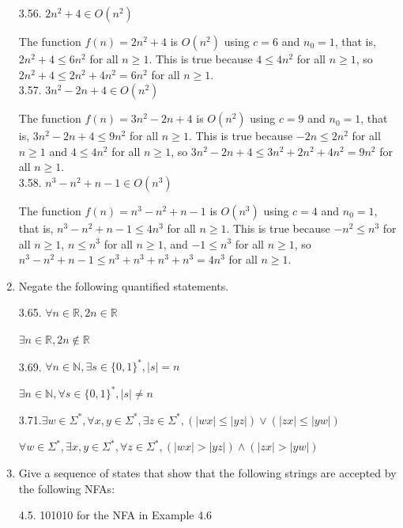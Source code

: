 \documentclass[10pt]{article}
\begin{document}
\begin{enumerate}[label={}]
            3.56. $2 n^2+4 \in O\left(n^2\right)$

            The function $f(n)=2 n^2+4$ is $O\left(n^2\right)$ using $c=6$ and $n_0=1$, that is, $2 n^2+4 \leq 6 n^2$ for all $n \geq 1$. This is true because $4 \leq 4 n^2$ for all $n \geq 1$, so $2 n^2+4 \leq 2n^2+4 n^2=6 n^2$ for all $n \geq 1$.\\

            3.57. $3 n^2-2 n+4 \in O\left(n^2\right)$

            The function $f(n)=3 n^2-2 n+4$ is $O\left(n^2\right)$ using $c=9$ and $n_0=1$, that is, $3 n^2-2 n+4 \leq 9 n^2$ for all $n \geq 1$. This is true because $-2 n \leq 2 n^2$ for all $n \geq 1$ and $4 \leq 4 n^2$ for all $n \geq 1$, so $3 n^2-2 n+4 \leq 3n^2+2 n^2 + 4 n^2=9 n^2$ for all $n \geq 1$.\\


            3.58. $n^3-n^2+n-1 \in O\left(n^3\right)$

            The function $f(n)=n^3-n^2+n-1$ is $O\left(n^3\right)$ using $c=4$ and $n_0=1$, that is, $n^3-n^2+n-1 \leq 4 n^3$ for all $n \geq 1$. This is true because $-n ^2 \leq n^3$ for all $n \geq 1$, $n \leq n^3$ for all $n \geq 1$, and $-1 \leq n^3$ for all $n \geq 1$, so $n^3-n^2+n-1 \leq n^3 + n^3 + n^3 + n^3=4 n^3$ for all $n \geq 1$.\\


      \item Negate the following quantified statements.


            3.65. $\forall n \in \mathbb{R}, 2 n \in \mathbb{R}$


            $\exists n \in \mathbb{R}, 2 n \notin \mathbb{R}$

            3.69. $\forall n \in \mathbb{N}, \exists s \in\{0,1\}^*,|s|=n$

            $\exists n \in \mathbb{N}, \forall s \in\{0,1\}^*, |s|\neq  n$

            3.71.$\exists w \in \Sigma^*, \forall x, y \in \Sigma^*, \exists z \in \Sigma^*,(|w x| \leq|y z|) \vee(|z x| \leq|y w|)$

            $\forall w \in \Sigma^*, \exists x, y \in \Sigma^*, \forall z \in \Sigma^*,(|w x| > |y z|) \wedge  (|z x| > |y w|)$


      \item Give a sequence of states that show that the following strings are accepted by the following NFAs:

            4.5. 101010 for the NFA in Example 4.6


\end{enumerate}
\end{document}
